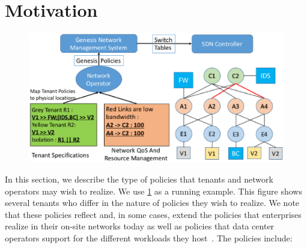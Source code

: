 \section{Motivation}
\begin{figure}
	\includegraphics[width=\columnwidth,center]{figures/architecture.eps}
	\label{fig:architecture}
\end{figure}
In this section, we describe the type of policies that tenants and
network operators may wish to realize. %
We use \cref{fig:architecture} as a running example. This figure shows several
tenants who differ in the nature of policies they wish to realize. We
note that these policies reflect and, in some cases, extend the
policies that enterprises realize in their on-site networks today as
well as policies that data center operators support for the different
workloads they host~\cite{mpa-imc15}.  The policies include:





